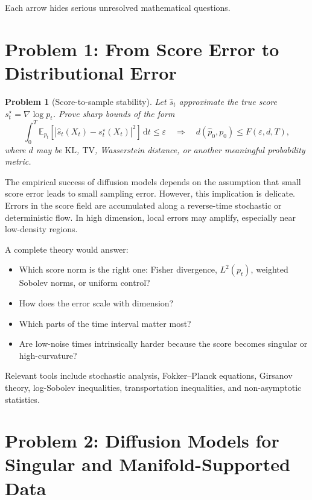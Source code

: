 \documentclass[11pt]{article}
\newtheorem{problem}{Problem}
\begin{document}
Each arrow hides serious unresolved mathematical questions.

\section{Problem 1: From Score Error to Distributional Error}

\begin{problem}[Score-to-sample stability]
Let $\widehat{s}_t$ approximate the true score $s_t^\star = \nabla \log p_t$. Prove sharp bounds of the form
\begin{equation}
\int_0^T \mathbb{E}_{p_t}
\left[
|\widehat{s}_t(X_t)-s_t^\star(X_t)|^2
\right]\,\mathrm{d}t
\leq \varepsilon
\quad \Longrightarrow \quad
d(\widehat{p}_0,p_0) \leq F(\varepsilon,d,T),
\end{equation}
where $d$ may be $\mathrm{KL}$, $\mathrm{TV}$, Wasserstein distance, or another meaningful probability metric.
\end{problem}

The empirical success of diffusion models depends on the assumption that small score error leads to small sampling error. However, this implication is delicate. Errors in the score field are accumulated along a reverse-time stochastic or deterministic flow. In high dimension, local errors may amplify, especially near low-density regions.

A complete theory would answer:
\begin{itemize}[leftmargin=*]
\item Which score norm is the right one: Fisher divergence, $L^2(p_t)$, weighted Sobolev norms, or uniform control?
\item How does the error scale with dimension?
\item Which parts of the time interval matter most?
\item Are low-noise times intrinsically harder because the score becomes singular or high-curvature?
\end{itemize}

Relevant tools include stochastic analysis, Fokker--Planck equations, Girsanov theory, log-Sobolev inequalities, transportation inequalities, and non-asymptotic statistics.

\section{Problem 2: Diffusion Models for Singular and Manifold-Supported Data}
\end{document}
